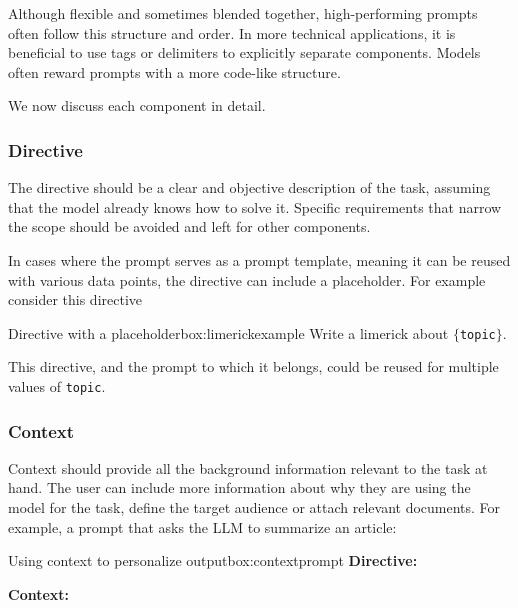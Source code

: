 Although flexible and sometimes blended together, high-performing prompts \\often follow this structure and order. 
In more technical applications, it is beneficial to use tags or delimiters to explicitly separate components.
Models often reward prompts with a more code-like structure\cite{10.1145/3544548.3581388}. 

We now discuss each component in detail.

\subsubsection{Directive}
The directive should be a clear and objective description of the task, assuming that the model
already knows how to solve it\cite{reynolds2021promptprogramminglargelanguage}. 
Specific requirements that narrow the scope should be avoided and left for other components.

In cases where the prompt serves as a prompt template, meaning it can be reused with various data points,
the directive can include a placeholder. For example consider this directive
\begin{figurebox}{Directive with a placeholder}{box:limerickexample}
    Write a limerick about \texttt{$\{$topic$\}$}.
\end{figurebox}
This directive, and the prompt to which it belongs, could be reused for multiple values of \texttt{topic}.

\subsubsection{Context}
Context should provide all the background information relevant to the task at hand.
The user can include more information about why they are using the model for the task,
define the target audience or attach relevant documents. For example, a prompt that asks the LLM to summarize an article:

\begin{figurebox}{Using context to personalize output}{box:contextprompt}
    \textbf{Directive:}
    
    
    \textbf{Context:}
    
\end{figurebox}


